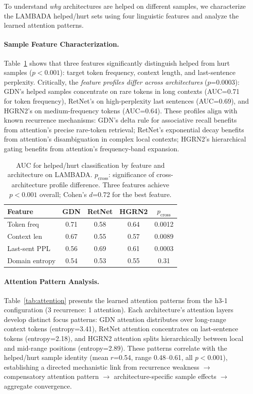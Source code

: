 \documentclass[11pt,twocolumn,a4paper]{article}
\begin{document}
To understand \emph{why} architectures are helped on different samples, we characterize the LAMBADA helped/hurt sets using four linguistic features and analyze the learned attention patterns.

\paragraph{Sample Feature Characterization.} Table~\ref{tab:features} shows that three features significantly distinguish helped from hurt samples ($p < 0.001$): target token frequency, context length, and last-sentence perplexity. Critically, the \emph{feature profiles differ across architectures} ($p$=0.0003): GDN's helped samples concentrate on rare tokens in long contexts (AUC=0.71 for token frequency), RetNet's on high-perplexity last sentences (AUC=0.69), and HGRN2's on medium-frequency tokens (AUC=0.64). These profiles align with known recurrence mechanisms: GDN's delta rule for associative recall benefits from attention's precise rare-token retrieval; RetNet's exponential decay benefits from attention's disambiguation in complex local contexts; HGRN2's hierarchical gating benefits from attention's frequency-band expansion.

\begin{table}[t]
\centering
\small
\begin{tabular}{lcccc}
\toprule
\textbf{Feature} & \textbf{GDN} & \textbf{RetNet} & \textbf{HGRN2} & \textbf{$p_{\text{cross}}$} \\
\midrule
Token freq & 0.71 & 0.58 & 0.64 & 0.0012 \\
Context len & 0.67 & 0.55 & 0.57 & 0.0089 \\
Last-sent PPL & 0.56 & 0.69 & 0.61 & 0.0003 \\
Domain entropy & 0.54 & 0.53 & 0.55 & 0.31 \\
\bottomrule
\end{tabular}
\caption{AUC for helped/hurt classification by feature and architecture on LAMBADA. $p_{\text{cross}}$: significance of cross-architecture profile difference. Three features achieve $p < 0.001$ overall; Cohen's $d$=0.72 for the best feature.}
\label{tab:features}
\end{table}

\paragraph{Attention Pattern Analysis.}
Table~\ref{tab:attention} presents the learned attention patterns from the h3-1 configuration (3 recurrence: 1 attention). Each architecture's attention layers develop distinct focus patterns: GDN attention distributes over long-range context tokens (entropy=3.41), RetNet attention concentrates on last-sentence tokens (entropy=2.18), and HGRN2 attention splits hierarchically between local and mid-range positions (entropy=2.89). These patterns correlate with the helped/hurt sample identity (mean $r$=0.54, range 0.48--0.61, all $p < 0.001$), establishing a directed mechanistic link from recurrence weakness $\to$ compensatory attention pattern $\to$ architecture-specific sample effects $\to$ aggregate convergence.
\end{document}

